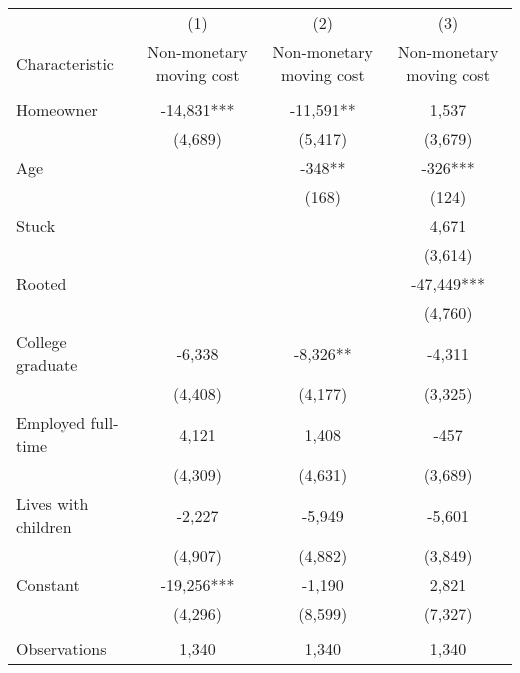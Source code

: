 \begin{tabular}{lccc} \hline
 & (1) & (2) & (3) \\
Characteristic & Non-monetary moving cost & Non-monetary moving cost & Non-monetary moving cost \\ \hline
 &  &  &  \\
Homeowner & -14,831*** & -11,591** & 1,537 \\
 & (4,689) & (5,417) & (3,679) \\
Age &  & -348** & -326*** \\
 &  & (168) & (124) \\
Stuck &  &  & 4,671 \\
 &  &  & (3,614) \\
Rooted &  &  & -47,449*** \\
 &  &  & (4,760) \\
College graduate & -6,338 & -8,326** & -4,311 \\
 & (4,408) & (4,177) & (3,325) \\
Employed full-time & 4,121 & 1,408 & -457 \\
 & (4,309) & (4,631) & (3,689) \\
Lives with children & -2,227 & -5,949 & -5,601 \\
 & (4,907) & (4,882) & (3,849) \\
Constant & -19,256*** & -1,190 & 2,821 \\
 & (4,296) & (8,599) & (7,327) \\
 &  &  &  \\
 Observations & 1,340 & 1,340 & 1,340 \\ \hline
\end{tabular}

